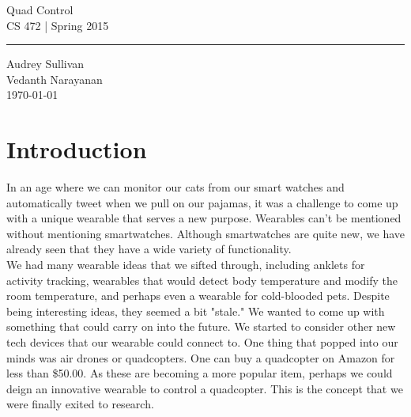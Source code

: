 \documentclass[12pt,letterpaper]{article}
\begin{document}
\begin{titlepage}
    \vspace*{4cm}
    \begin{flushright}
    {\huge
        Quad Control\\[5mm]
    }
    {\large
        CS 472 | Spring 2015
     }
    \end{flushright}
\hrule
    \begin{flushright}
	Audrey Sullivan\\
	Vedanth Narayanan\\
    \vfill
	\today\\
    \end{flushright}
\end{titlepage}

\raggedright

\section*{Introduction}
\hspace{1cm}In an age where we can monitor our cats from our smart watches and automatically tweet when we pull on our pajamas, it was a challenge to come up with a unique wearable that serves a new purpose. Wearables can't be mentioned without mentioning smartwatches. Although smartwatches are quite new, we have already seen that they have a wide variety of functionality.\\
\hspace{1cm}We had many wearable ideas that we sifted through, including anklets for activity tracking, wearables that would detect body temperature and modify the room temperature, and perhaps even a wearable for cold-blooded pets. Despite being interesting ideas, they seemed a bit "stale." We wanted to come up with something that could carry on into the future. We started to consider other new tech devices that our wearable could connect to. One thing that popped into our minds was air drones or quadcopters. One can buy a quadcopter on Amazon for less than \$50.00. As these are becoming a more popular item, perhaps we could deign an innovative wearable to control a quadcopter. This is the concept that we were finally exited to research.
\end{document}
